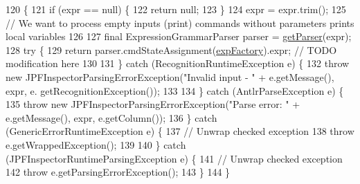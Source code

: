 \begin{DoxyCode}
120                                                                                                            
                                                \{
121     \textcolor{keywordflow}{if} (expr == null) \{
122       \textcolor{keywordflow}{return} null;
123     \}
124     expr = expr.trim();
125     \textcolor{comment}{// We want to process empty inputs (print) commands without parameters prints local variables}
126 
127     \textcolor{keyword}{final} ExpressionGrammarParser parser = \hyperlink{classgov_1_1nasa_1_1jpf_1_1inspector_1_1server_1_1expression_1_1_expression_parser_aaef85bb6690c79fcbadd105acdf46e18}{getParser}(expr);
128     \textcolor{keywordflow}{try} \{
129       \textcolor{keywordflow}{return} parser.cmdStateAssignment(\hyperlink{classgov_1_1nasa_1_1jpf_1_1inspector_1_1server_1_1expression_1_1_expression_parser_ac104f9da945e44fd45fb00c2dfb83706}{expFactory}).expr; \textcolor{comment}{// TODO modification here}
130 
131     \} \textcolor{keywordflow}{catch} (RecognitionRuntimeException e) \{
132       \textcolor{keywordflow}{throw} \textcolor{keyword}{new} JPFInspectorParsingErrorException(\textcolor{stringliteral}{"Invalid input - "} + e.getMessage(), expr, e.
      getRecognitionException());
133 
134     \} \textcolor{keywordflow}{catch} (AntlrParseException e) \{
135       \textcolor{keywordflow}{throw} \textcolor{keyword}{new} JPFInspectorParsingErrorException(\textcolor{stringliteral}{"Parse error: "} + e.getMessage(), expr, e.getColumn());
136     \}  \textcolor{keywordflow}{catch} (GenericErrorRuntimeException e) \{
137       \textcolor{comment}{// Unwrap checked exception}
138       \textcolor{keywordflow}{throw} e.getWrappedException();
139 
140     \} \textcolor{keywordflow}{catch} (JPFInspectorRuntimeParsingException e) \{
141       \textcolor{comment}{// Unwrap checked exception}
142       \textcolor{keywordflow}{throw} e.getParsingErrorException();
143     \}
144   \}
\end{DoxyCode}
